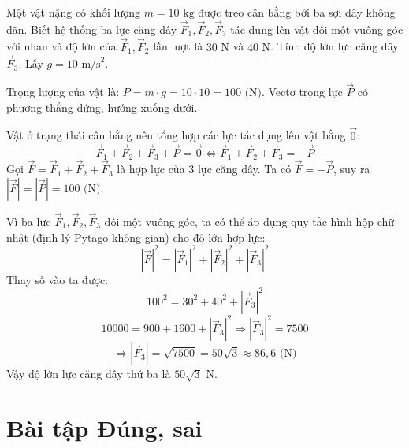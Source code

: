 \documentclass[12pt]{article}
\begin{document}
	\begin{vidu}[1]
		Một vật nặng có khối lượng $m = 10 \text{ kg}$ được treo cân bằng bởi ba sợi dây không dãn. Biết hệ thống ba lực căng dây $\vec{F}_1, \vec{F}_2, \vec{F}_3$ tác dụng lên vật đôi một vuông góc với nhau và độ lớn của $\vec{F}_1, \vec{F}_2$ lần lượt là $30 \text{ N}$ và $40 \text{ N}$. Tính độ lớn lực căng dây $\vec{F}_3$. Lấy $g = 10 \text{ m/s}^2$.
	\end{vidu}
	
	\begin{loigiai}
		Trọng lượng của vật là: $P = m \cdot g = 10 \cdot 10 = 100 \text{ (N)}$.
		Vectơ trọng lực $\vec{P}$ có phương thẳng đứng, hướng xuống dưới.
		
		Vật ở trạng thái cân bằng nên tổng hợp các lực tác dụng lên vật bằng $\vec{0}$:
		$$ \vec{F}_1 + \vec{F}_2 + \vec{F}_3 + \vec{P} = \vec{0} \Leftrightarrow \vec{F}_1 + \vec{F}_2 + \vec{F}_3 = -\vec{P} $$
		Gọi $\vec{F} = \vec{F}_1 + \vec{F}_2 + \vec{F}_3$ là hợp lực của 3 lực căng dây. Ta có $\vec{F} = -\vec{P}$, suy ra $|\vec{F}| = |\vec{P}| = 100 \text{ (N)}$.
		
		Vì ba lực $\vec{F}_1, \vec{F}_2, \vec{F}_3$ đôi một vuông góc, ta có thể áp dụng quy tắc hình hộp chữ nhật (định lý Pytago không gian) cho độ lớn hợp lực:
		$$ |\vec{F}|^2 = |\vec{F}_1|^2 + |\vec{F}_2|^2 + |\vec{F}_3|^2 $$
		Thay số vào ta được:
		$$ 100^2 = 30^2 + 40^2 + |\vec{F}_3|^2 $$
		$$ 10000 = 900 + 1600 + |\vec{F}_3|^2 \Rightarrow |\vec{F}_3|^2 = 7500 $$
		$$ \Rightarrow |\vec{F}_3| = \sqrt{7500} = 50\sqrt{3} \approx 86,6 \text{ (N)} $$
		Vậy độ lớn lực căng dây thứ ba là $50\sqrt{3} \text{ N}$.
	\end{loigiai}
	
	\newpage
	
	\section{Bài tập Đúng, sai}
	
\end{document}
